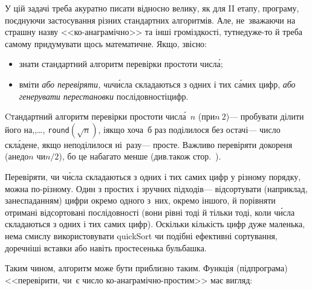 \Tutorial	У цій задачі треба акуратно писати відносно велику, як для II етапу, програму, поєднуючи застосування різних стандартних алгоритмів. Але, не~зважаючи на страшну назву <<ко-ана\-гра\-мічно>> та інші громіздкості, тут\nolinebreak[2] не\nolinebreak[3] дуже-то й треба самому придумувати щось математичне. Якщо, звісно:

\begin{itemize}[leftmargin=*,itemsep=0pt,partopsep=0pt,topsep=0pt,parsep=0pt]

\item
знати стандартний алгоритм перевірки простоти числ\'{а};

\item
вміти \emph{або перевіряти, чи}\nolinebreak[2] ч\'{и}сла складаються з одних і тих с\'{а}мих цифр, \emph{або генерувати перестановки} послідовності\nolinebreak[3] цифр.

\end{itemize}

Cтандартний алгоритм перевірки простоти числ\'{а}~$n$ (при\nolinebreak[2] $n\>2$)\nolinebreak[3] --- пробувати ділити його на,,\nolinebreak[3] \dots, \verb"round"$(\sqrt{n})$, і\nolinebreak[3] якщо хоча~б раз поділилося без остачі\nolinebreak[3] --- число скл\'{а}дене, якщо не\nolinebreak[3] поділилося ні~разу\nolinebreak[3] --- просте. Важливо перевіряти до\nolinebreak[2] кореня (а\nolinebreak[3] не\nolinebreak[2] до\nolinebreak[3] $n$ чи\nolinebreak[2] $n/2$), бо це набагато менше (див.\nolinebreak[2] також стор.~\pageref{text:about-sqrt-n-in-divisors-list}).

Перевіряти, чи ч\'{и}сла складаються з одних і тих самих цифр у різному порядку, можна по-різному. Один з простих і зручних підходів\nolinebreak[3] --- відсортувати (наприклад, за\nolinebreak[3] неспаданням) цифри окремо одного з~них, окремо іншого, й порівняти отримані відсортовані послідовності (вони рівні тоді й тільки тоді, коли ч\'{и}сла складаються з одних і тих самих цифр). Оскільки кількість цифр дуже маленька, нема смислу використовувати quickSort чи подібні ефективні сортування, доречніші вставки або навіть простесенька бульбашка.

Таким чином, алгоритм може бути приблизно таким. 
Функція (підпрограма) <<перевірити, чи~є число ко-анаграмічно-простим>> має вигляд:

